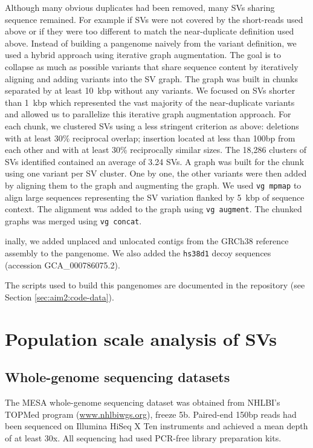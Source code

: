 \documentclass[11pt]{ucscthesis}
\begin{document}
Although many obvious duplicates had been removed, many SVs sharing sequence remained.
For example if SVs were not covered by the short-reads used above or if they were too different to match the near-duplicate definition used above.
Instead of building a pangenome naively from the variant definition, we used a hybrid approach using iterative graph augmentation.
The goal is to collapse as much as possible variants that share sequence content by iteratively aligning and adding variants into the SV graph.
The graph was built in chunks separated by at least 10~kbp without any variants.
We focused on SVs shorter than 1~kbp which represented the vast majority of the near-duplicate variants and allowed us to parallelize this iterative graph augmentation approach.
For each chunk, we clustered SVs using a less stringent criterion as above: deletions with at least 30\% reciprocal overlap; insertion located at less than 100bp from each other and with at least 30\% reciprocally similar sizes.
The 18,286 clusters of SVs identified contained an average of 3.24 SVs.
A graph was built for the chunk using one variant per SV cluster.
One by one, the other variants were then added by aligning them to the graph and augmenting the graph.
We used \texttt{vg~mpmap} \cite{sibbesen_haplotype-aware_2023} to align large sequences representing the SV variation flanked by 5~kbp of sequence context.
The alignment was added to the graph using \texttt{vg~augment}.
The chunked graphs was merged using \texttt{vg~concat}.

inally, we added unplaced and unlocated contigs from the GRCh38 reference assembly to the pangenome.
We also added the \texttt{hs38d1} decoy sequences (accession GCA\_000786075.2).

The scripts used to build this pangenomes are documented in the repository (see Section \ref{sec:aim2:code-data}).

\section{Population scale analysis of SVs}

\subsection{Whole-genome sequencing datasets}

The MESA whole-genome sequencing dataset was obtained from NHLBI’s TOPMed program (\url{www.nhlbiwgs.org}), freeze 5b.
Paired-end 150bp reads had been sequenced on Illumina HiSeq X Ten instruments and achieved a mean depth of at least 30x.
All sequencing had used PCR-free library preparation kits.
\end{document}
